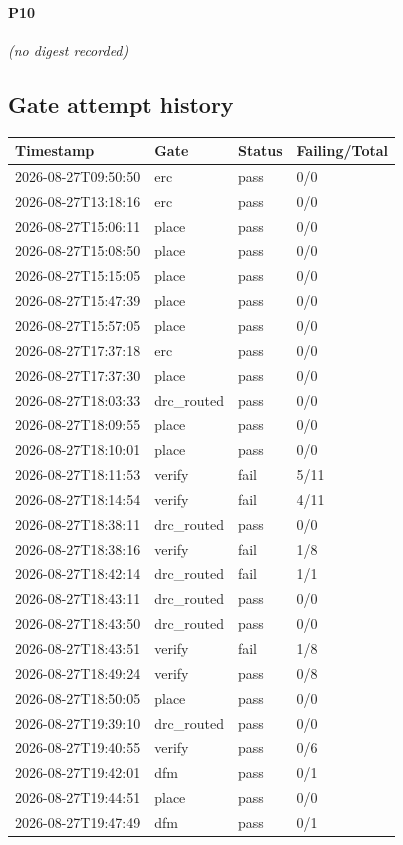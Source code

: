 \documentclass[11pt,a4paper]{article}
\begin{document}
\paragraph*{P10}
\emph{(no digest recorded)}
\subsection*{Gate attempt history}
{\small
\begin{longtable}{llll}
\toprule
\textbf{Timestamp} & \textbf{Gate} & \textbf{Status} & \textbf{Failing/Total} \\
\midrule
\endhead
2026-08-27T09:50:50 & erc & pass & 0/0 \\
2026-08-27T13:18:16 & erc & pass & 0/0 \\
2026-08-27T15:06:11 & place & pass & 0/0 \\
2026-08-27T15:08:50 & place & pass & 0/0 \\
2026-08-27T15:15:05 & place & pass & 0/0 \\
2026-08-27T15:47:39 & place & pass & 0/0 \\
2026-08-27T15:57:05 & place & pass & 0/0 \\
2026-08-27T17:37:18 & erc & pass & 0/0 \\
2026-08-27T17:37:30 & place & pass & 0/0 \\
2026-08-27T18:03:33 & drc\_routed & pass & 0/0 \\
2026-08-27T18:09:55 & place & pass & 0/0 \\
2026-08-27T18:10:01 & place & pass & 0/0 \\
2026-08-27T18:11:53 & verify & fail & 5/11 \\
2026-08-27T18:14:54 & verify & fail & 4/11 \\
2026-08-27T18:38:11 & drc\_routed & pass & 0/0 \\
2026-08-27T18:38:16 & verify & fail & 1/8 \\
2026-08-27T18:42:14 & drc\_routed & fail & 1/1 \\
2026-08-27T18:43:11 & drc\_routed & pass & 0/0 \\
2026-08-27T18:43:50 & drc\_routed & pass & 0/0 \\
2026-08-27T18:43:51 & verify & fail & 1/8 \\
2026-08-27T18:49:24 & verify & pass & 0/8 \\
2026-08-27T18:50:05 & place & pass & 0/0 \\
2026-08-27T19:39:10 & drc\_routed & pass & 0/0 \\
2026-08-27T19:40:55 & verify & pass & 0/6 \\
2026-08-27T19:42:01 & dfm & pass & 0/1 \\
2026-08-27T19:44:51 & place & pass & 0/0 \\
2026-08-27T19:47:49 & dfm & pass & 0/1 \\
\bottomrule
\end{longtable}
}
\end{document}
